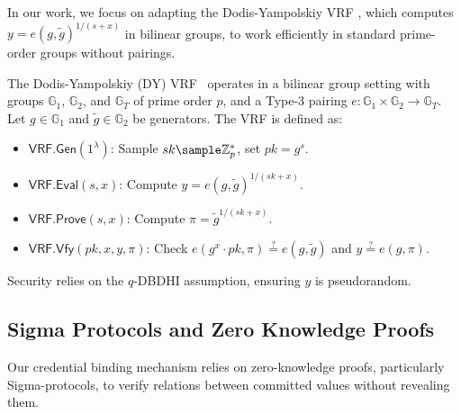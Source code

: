     
In our work, we focus on adapting the Dodis-Yampolskiy VRF \cite{hutchison_verifiable_2005}, which computes $y = e(g, \tilde{g})^{1/(s+x)}$ in bilinear groups, to work efficiently in standard prime-order groups without pairings.

\begin{definition}
    The Dodis-Yampolskiy (DY) VRF~\cite{hutchison_verifiable_2005} operates in a bilinear group setting with groups $\mathbb{G}_1$, $\mathbb{G}_2$, and $\mathbb{G}_T$ of prime order $p$, and a Type-3 pairing $e: \mathbb{G}_1 \times \mathbb{G}_2 \to \mathbb{G}_T$. Let $g \in \mathbb{G}_1$ and $\tilde{g} \in \mathbb{G}_2$ be generators. The VRF is defined as:

\begin{itemize}
    \item $\mathsf{VRF.Gen}(1^\lambda)$: Sample $sk \sample \mathbb{Z}_p^*$, set $pk = g^{s}$.
    \item $\mathsf{VRF.Eval}(s, x)$: Compute $y = e(g, \tilde{g})^{1/(sk + x)}$.
    \item $\mathsf{VRF.Prove}(s, x)$: Compute $\pi = \tilde{g}^{1/(sk + x)}$.
    \item $\mathsf{VRF.Vfy}(pk, x, y, \pi)$: Check $e(g^{x} \cdot pk, \pi) \stackrel{?}{=} e(g, \tilde{g})$ and $y \stackrel{?}{=} e(g, \pi)$.
\end{itemize}

Security relies on the $q$-DBDHI assumption, ensuring $y$ is pseudorandom.

\end{definition}



\subsection{Sigma Protocols and Zero Knowledge Proofs}
Our credential binding mechanism relies on zero-knowledge proofs, particularly Sigma-protocols, to verify relations between committed values without revealing them.


